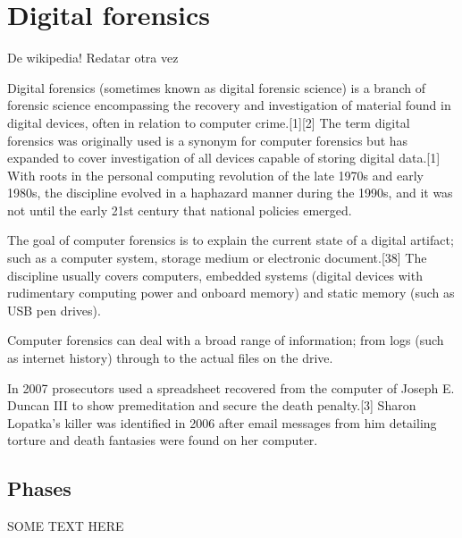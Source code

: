 \chapter{Digital forensics}

De wikipedia! Redatar otra vez

Digital forensics (sometimes known as digital forensic science) is a branch of forensic 
science encompassing the recovery and investigation of material found in digital devices,
often in relation to computer crime.[1][2] The term digital forensics was originally used
is a synonym for computer forensics but has expanded to cover investigation of all devices 
capable of storing digital data.[1] With roots in the personal computing revolution of
the late 1970s and early 1980s, the discipline evolved in a haphazard manner during the 
1990s, and it was not until the early 21st century that national policies emerged.

The goal of computer forensics is to explain the current state of a digital artifact; such
as a computer system, storage medium or electronic document.[38] The discipline usually
covers computers, embedded systems (digital devices with rudimentary computing power and
onboard memory) and static memory (such as USB pen drives).

Computer forensics can deal with a broad range of information; from logs (such as internet
history) through to the actual files on the drive.

In 2007 prosecutors used a spreadsheet recovered from the computer of Joseph E. Duncan III
to show premeditation and secure the death penalty.[3] Sharon Lopatka's killer was
identified in 2006 after email messages from him detailing torture and death fantasies were
found on her computer.

\section{Phases}

SOME TEXT HERE

